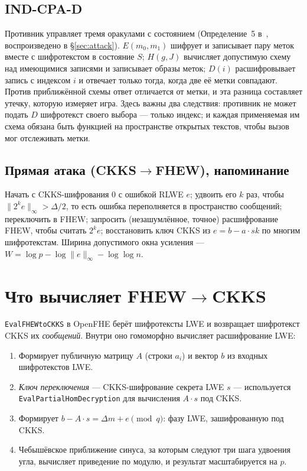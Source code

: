 \documentclass[11pt]{article}
\newcommand{\fto}{\texorpdfstring{FHEW$\to$CKKS}{FHEW-to-CKKS}}
\newcommand{\ctf}{\texorpdfstring{CKKS$\to$FHEW}{CKKS-to-FHEW}}
\newcommand{\code}[1]{\texttt{#1}}
\begin{document}
\subsection{IND-CPA-D}
Противник управляет тремя оракулами с состоянием (Определение~5 в~\cite{santato2026}, воспроизведено
в \S\ref{sec:attack}). $E(m_0, m_1)$ шифрует и записывает пару меток вместе с шифротекстом в
состояние $S$; $H(g, J)$ вычисляет допустимую схему над имеющимися записями и записывает образы
меток; $D(i)$ расшифровывает запись с индексом $i$ и отвечает только тогда, когда две её метки
совпадают. Против приближённой схемы ответ отличается от метки, и эта разница составляет утечку,
которую измеряет игра. Здесь важны два следствия: противник не может подать $D$ шифротекст своего
выбора --- только индекс; и каждая применяемая им схема обязана быть функцией на пространстве
открытых текстов, чтобы вызов мог отслеживать метки.

\subsection{Прямая атака (\ctf{}), напоминание}
Начать с CKKS-шифрования $0$ с ошибкой RLWE $e$; удвоить его $k$ раз, чтобы
$\|2^k e\|_\infty > \Delta/2$, то есть ошибка переполняется в пространство сообщений; переключить в
FHEW; запросить (незашумлённое, точное) расшифрование FHEW, чтобы считать $2^k e$; восстановить ключ
CKKS из $e = b - a\cdot \mathit{sk}$ по многим шифротекстам. Ширина допустимого окна усиления ---
$W = \log p - \log\|e\|_\infty - \log\log n$.

\section{Что вычисляет \fto{}}
\label{sec:computes}

\code{EvalFHEWtoCKKS} в OpenFHE берёт шифротексты LWE и возвращает шифротекст CKKS их
\emph{сообщений}. Внутри оно гомоморфно вычисляет расшифрование LWE:
\begin{enumerate}
  \item Формирует публичную матрицу $A$ (строки $a_i$) и вектор $b$ из входных шифротекстов LWE.
  \item \emph{Ключ переключения} --- CKKS-шифрование секрета LWE $s$ --- используется
    \code{EvalPartialHomDecryption} для вычисления $A\cdot s$ под CKKS.
  \item Формирует $b - A\cdot s = \Delta m + e \pmod q$: фазу LWE, зашифрованную под CKKS.
  \item Чебышёвское приближение синуса, за которым следуют три шага удвоения угла, вычисляет
    приведение по модулю, и результат масштабируется на $p$.
\end{enumerate}
\end{document}

